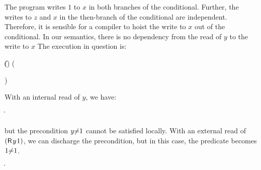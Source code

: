 The program writes $1$ to $x$ in both branches of the conditional.  Further,
the writes to $z$ and $x$ in the then-branch of the conditional are
independent.  Therefore, it is sensible for a compiler to hoist the write to
$x$ out of the conditional.  In our semantics, there is no dependency from
the read of $y$ to the write to $x$
The execution in question is:
\begin{displaymathsmall}
  \begin{tikzcenter}[node distance=1em]
  \end{tikzcenter}
  \Bigm\|
  ()
  \prefix
  \left(
    \begin{tikzcenter}[node distance=.5em]
    \end{tikzcenter}
  \right)
\end{displaymathsmall}
With an internal read of $y$, we have:
\begin{displaymathsmall}
  \begin{tikzcenter}[node distance=1em]
  \end{tikzcenter}
  \Bigm\|
    \begin{tikzcenter}[node distance=1em]
    \end{tikzcenter}
\end{displaymathsmall}
but the precondition $y{\neq}1$ cannot be satisfied locally.
With an external read of $(\DR{y}{1})$, we can discharge the precondition, but in this
case, the predicate becomes $1{\neq} 1$. 
\begin{displaymathsmall}
  \begin{tikzcenter}[node distance=1em]
  \end{tikzcenter}
  \Bigm\|  
    \begin{tikzcenter}[node distance=1em]
    \end{tikzcenter}
\end{displaymathsmall}


